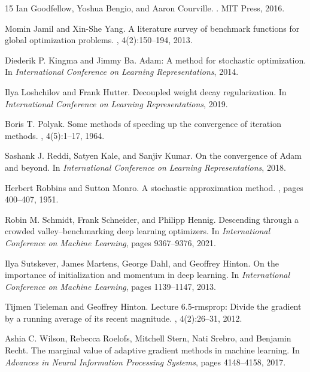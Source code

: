 \documentclass[12pt,a4paper]{article}
\begin{document}
\begin{thebibliography}{15}
Ian Goodfellow, Yoshua Bengio, and Aaron Courville.
.
\newblock MIT Press, 2016.

Momin Jamil and Xin-She Yang.
\newblock A literature survey of benchmark functions for global optimization problems.
, 4(2):150--194, 2013.

Diederik P. Kingma and Jimmy Ba.
\newblock Adam: A method for stochastic optimization.
\newblock In {\em International Conference on Learning Representations}, 2014.

Ilya Loshchilov and Frank Hutter.
\newblock Decoupled weight decay regularization.
\newblock In {\em International Conference on Learning Representations}, 2019.

Boris T. Polyak.
\newblock Some methods of speeding up the convergence of iteration methods.
, 4(5):1--17, 1964.

Sashank J. Reddi, Satyen Kale, and Sanjiv Kumar.
\newblock On the convergence of Adam and beyond.
\newblock In {\em International Conference on Learning Representations}, 2018.

Herbert Robbins and Sutton Monro.
\newblock A stochastic approximation method.
, pages 400--407, 1951.

Robin M. Schmidt, Frank Schneider, and Philipp Hennig.
\newblock Descending through a crowded valley--benchmarking deep learning optimizers.
\newblock In {\em International Conference on Machine Learning}, pages 9367--9376, 2021.

Ilya Sutskever, James Martens, George Dahl, and Geoffrey Hinton.
\newblock On the importance of initialization and momentum in deep learning.
\newblock In {\em International Conference on Machine Learning}, pages 1139--1147, 2013.

Tijmen Tieleman and Geoffrey Hinton.
\newblock Lecture 6.5-rmsprop: Divide the gradient by a running average of its recent magnitude.
, 4(2):26--31, 2012.

Ashia C. Wilson, Rebecca Roelofs, Mitchell Stern, Nati Srebro, and Benjamin Recht.
\newblock The marginal value of adaptive gradient methods in machine learning.
\newblock In {\em Advances in Neural Information Processing Systems}, pages 4148--4158, 2017.

\end{thebibliography}
\end{document}
